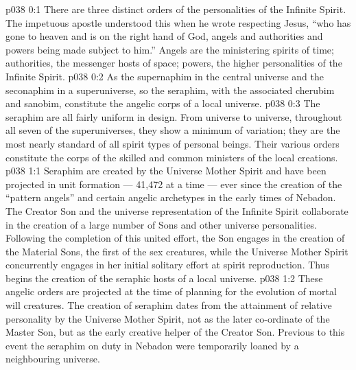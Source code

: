 \author{Melchizedek}
\vs p038 0:1 There are three distinct orders of the personalities of the Infinite Spirit. The impetuous apostle understood this when he wrote respecting Jesus, “who has gone to heaven and is on the right hand of God, angels and authorities and powers being made subject to him.” Angels are the ministering spirits of time; authorities, the messenger hosts of space; powers, the higher personalities of the Infinite Spirit.
\vs p038 0:2 \pc As the supernaphim in the central universe and the seconaphim in a superuniverse, so the seraphim, with the associated cherubim and sanobim, constitute the angelic corps of a local universe.
\vs p038 0:3 The seraphim are all fairly uniform in design. From universe to universe, throughout all seven of the superuniverses, they show a minimum of variation; they are the most nearly standard of all spirit types of personal beings. Their various orders constitute the corps of the skilled and common ministers of the local creations.
\vs p038 1:1 Seraphim are created by the Universe Mother Spirit and have been projected in unit formation --- 41,472 at a time --- ever since the creation of the “pattern angels” and certain angelic archetypes in the early times of Nebadon. The Creator Son and the universe representation of the Infinite Spirit collaborate in the creation of a large number of Sons and other universe personalities. Following the completion of this united effort, the Son engages in the creation of the Material Sons, the first of the sex creatures, while the Universe Mother Spirit concurrently engages in her initial solitary effort at spirit reproduction. Thus begins the creation of the seraphic hosts of a local universe.
\vs p038 1:2 These angelic orders are projected at the time of planning for the evolution of mortal will creatures. The creation of seraphim dates from the attainment of relative personality by the Universe Mother Spirit, not as the later co\hyp{}ordinate of the Master Son, but as the early creative helper of the Creator Son. Previous to this event the seraphim on duty in Nebadon were temporarily loaned by a neighbouring universe.
